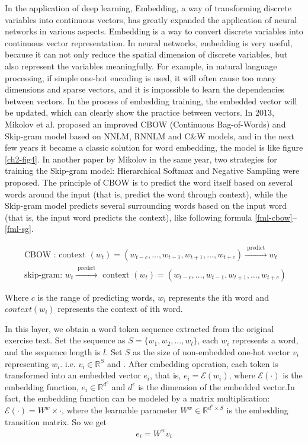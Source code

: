 In the application of deep learning, Embedding, a way of transforming discrete variables into continuous vectors, has greatly expanded the application of neural networks in various aspects. Embedding is a way to convert discrete variables into continuous vector representation. In neural networks, embedding is very useful, because it can not only reduce the spatial dimension of discrete variables, but also represent the variables meaningfully. For example, in natural language processing, if simple one-hot encoding is used, it will often cause too many dimensions and sparse vectors, and it is impossible to learn the dependencies between vectors. In the process of embedding training, the embedded vector will be updated, which can clearly show the practice between vectors. In 2013, Mikolov et al. proposed an improved CBOW (Continuous Bag-of-Words) and Skip-gram model based on NNLM, RNNLM and C\&W models\cite{mikolov2013efficient}, and in the next few years it became a classic solution for word embedding, the model is like figure \ref{ch2-fig4}. In another paper by Mikolov in the same year, two strategies for training the Skip-gram model: Hierarchical Softmax and Negative Sampling were proposed\cite{mikolov2013distributed}. The principle of CBOW is to predict the word itself based on several words around the input (that is, predict the word through context), while the Skip-gram model predicts several surrounding words based on the input word (that is, the input word predicts the context), like following formula \ref{fml-cbow}--\ref{fml-sg}.

\begin{align}
	\text { CBOW : context }\left(w_{t}\right)=\left(w_{t-c}, \ldots, w_{t-1}, w_{t+1}, \ldots, w_{t+c}\right) \stackrel{\text { predict }}{\longrightarrow} w_{t} \label{fml-cbow} \\
	\text { skip-gram: } w_{t} \stackrel{\text { predict }}{\longrightarrow} \text { context }\left(w_{t}\right)=\left(w_{t-c}, \ldots, w_{t-1}, w_{t+1}, \ldots, w_{t+c}\right) \label{fml-sg}
\end{align}

Where $c$ is the range of predicting words, $w_i$ represents the ith word and $context(w_i)$ represents the context of ith word.

In this layer, we obtain a word token sequence extracted from the original exercise text. Set the sequence as $S=\{w_1,w_2,...,w_l\}$, each $w_i$ represents a word, and the sequence length is $l$. Set $S$ as the size of non-embedded one-hot vector $v_i$ representing $w_i$. i.e. $v_i\in \mathbb{R}^{S}$ and . After embedding operation, each token is transformed into an embedded vector $e_i$, that is, $e_i=\mathcal{E}(w_i)$, where $\mathcal{E}(\cdot)$ is the embedding function, $e_i\in \mathbb{R}^{d^{e}}$ and $d^e$ is the dimension of the embedded vector.In fact, the embedding function can be modeled by a matrix multiplication: $ \mathcal {E} (\cdot) = W^w\times \cdot$, where the learnable parameter $W^w\in \mathbb {R} ^ {d^{e}\times S} $ is the embedding transition matrix. So we get
\begin{align}
	e_i = W^w v_i
\end{align}

